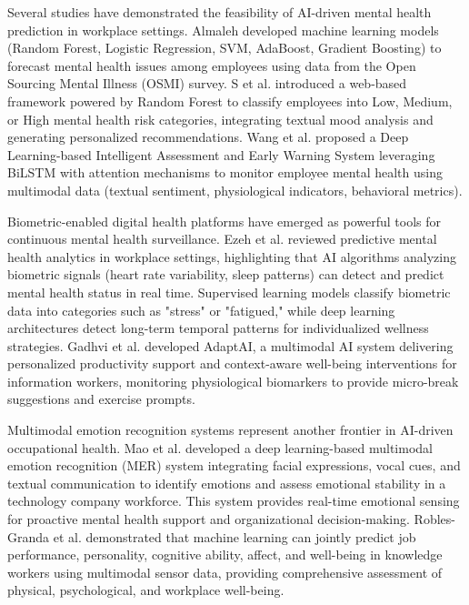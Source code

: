 \documentclass[journal,twoside,10pt]{IEEEtran}
\begin{document}
Several studies have demonstrated the feasibility of AI-driven mental health prediction in workplace settings. Almaleh \cite{ref23} developed machine learning models (Random Forest, Logistic Regression, SVM, AdaBoost, Gradient Boosting) to forecast mental health issues among employees using data from the Open Sourcing Mental Illness (OSMI) survey. S et al. \cite{ref24} introduced a web-based framework powered by Random Forest to classify employees into Low, Medium, or High mental health risk categories, integrating textual mood analysis and generating personalized recommendations. Wang et al. \cite{ref16} proposed a Deep Learning-based Intelligent Assessment and Early Warning System leveraging BiLSTM with attention mechanisms to monitor employee mental health using multimodal data (textual sentiment, physiological indicators, behavioral metrics).

Biometric-enabled digital health platforms have emerged as powerful tools for continuous mental health surveillance. Ezeh et al. \cite{ref30} reviewed predictive mental health analytics in workplace settings, highlighting that AI algorithms analyzing biometric signals (heart rate variability, sleep patterns) can detect and predict mental health status in real time. Supervised learning models classify biometric data into categories such as "stress" or "fatigued," while deep learning architectures detect long-term temporal patterns for individualized wellness strategies. Gadhvi et al. \cite{ref9} developed AdaptAI, a multimodal AI system delivering personalized productivity support and context-aware well-being interventions for information workers, monitoring physiological biomarkers to provide micro-break suggestions and exercise prompts.

Multimodal emotion recognition systems represent another frontier in AI-driven occupational health. Mao et al. \cite{ref17} developed a deep learning-based multimodal emotion recognition (MER) system integrating facial expressions, vocal cues, and textual communication to identify emotions and assess emotional stability in a technology company workforce. This system provides real-time emotional sensing for proactive mental health support and organizational decision-making. Robles-Granda et al. \cite{ref7} demonstrated that machine learning can jointly predict job performance, personality, cognitive ability, affect, and well-being in knowledge workers using multimodal sensor data, providing comprehensive assessment of physical, psychological, and workplace well-being.
\end{document}

